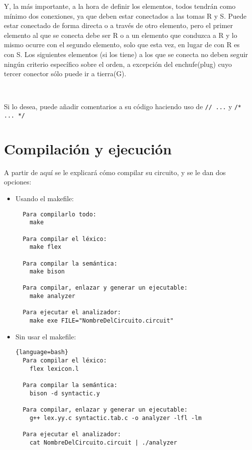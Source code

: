 \documentclass{article}
\begin{document}
Y, la más importante, a la hora de definir los elementos, todos tendrán como mínimo dos conexiones, ya que deben estar conectados a las tomas R y S. Puede estar conectado de forma directa o a través de otro elemento, pero el primer elemento al que se conecta debe ser R o a un elemento que conduzca a R y lo mismo ocurre con el segundo elemento, solo que esta vez, en lugar de con R es con S. Los siguientes elementos (si los tiene) a los que se conecta no deben seguir ningún criterio específico sobre el orden, a excepción del enchufe(plug) cuyo tercer conector sólo puede ir a tierra(G).

\

Si lo desea, puede añadir comentarios a su código haciendo uso de \texttt{// ...} y \texttt{/* ... */}

\section{Compilación y ejecución}

\lstset{style=bash}

A partir de aquí se le explicará cómo compilar su circuito, y se le dan dos opciones:
\begin{itemize}
\item Usando el makefile:
  \begin{lstlisting}
  Para compilarlo todo:
    make

  Para compilar el léxico:
    make flex

  Para compilar la semántica:
    make bison

  Para compilar, enlazar y generar un ejecutable:
    make analyzer

  Para ejecutar el analizador:
    make exe FILE="NombreDelCircuito.circuit"
\end{lstlisting}
\item Sin usar el makefile:
\begin{lstlisting}[basicstyle=\footnotesize]{language=bash}
  Para compilar el léxico:
    flex lexicon.l

  Para compilar la semántica:
    bison -d syntactic.y

  Para compilar, enlazar y generar un ejecutable:
    g++ lex.yy.c syntactic.tab.c -o analyzer -lfl -lm

  Para ejecutar el analizador:
    cat NombreDelCircuito.circuit | ./analyzer

\end{lstlisting}
\end{itemize}
\end{document}
